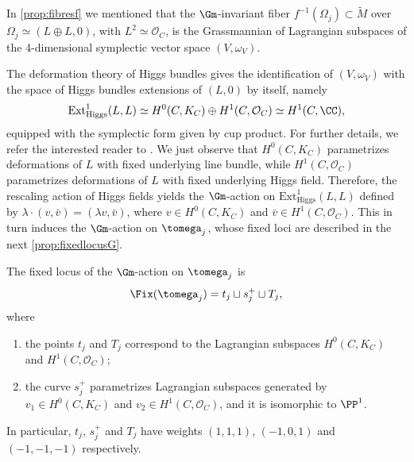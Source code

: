 In \cref{prop:fibresf} we mentioned that the $\Gm$\nobreakdash-invariant fiber $f^{-1}(\Omega_j) \subset \widetilde{M}$ over $\Omega_j \simeq (L \oplus L, 0)$, with $L^2 \simeq \mathcal{O}_C$, is the Grassmannian of Lagrangian subspaces of the 4-dimensional symplectic vector space $(V, \omega_V)$.

The deformation theory of Higgs bundles gives the identification of $(V, \omega_V)$ with the space of Higgs bundles extensions of $(L,0)$ by itself, namely
\[
\mathrm{Ext}^1_{\mathrm{Higgs}}(L,L)\simeq H^0(C, K_C) \oplus H^1(C, \mathcal{O}_C) \simeq H^1(C, \CC),
\]
equipped with the symplectic form given by cup product. For further details, we refer the interested reader to \cite[\S 3.2.2]{Felisetti2018}. We just observe that $H^0(C, K_C)$ parametrizes deformations of $L$ with fixed underlying line bundle, while $H^1(C, \mathcal{O}_C)$ parametrizes deformations of $L$ with fixed underlying Higgs field. Therefore, the rescaling action of Higgs fields yields the $\Gm$\nobreakdash-action on $\mathrm{Ext}^1_{\mathrm{Higgs}}(L,L)$ defined by
$\lambda \cdot (v,\bar{v})=(\lambda v, \bar{v})$, where $v \in H^0(C, K_C)$ and $\bar{v} \in H^1(C, \mathcal{O}_C)$. This in turn induces the $\Gm$\nobreakdash-action on $\tomega_j$, whose fixed loci are described in the next \cref{prop:fixedlocusG}.
\begin{prop} \label{prop:fixedlocusG}
The fixed locus of the $\Gm$\nobreakdash-action on $\tomega_j$ is
\[
\Fix(\tomega_j)= t_j \sqcup s^+_j \sqcup T_j,
\]
where
\begin{enumerate}
\item the points $t_j$ and $T_j$ correspond to the Lagrangian subspaces $H^0(C, K_C)$ and $H^1(C, \mathcal{O}_C)$;
\item the curve $s^+_j$ parametrizes Lagrangian subspaces generated by $v_1 \in H^0(C, K_C)$ and $v_2 \in H^1(C, \mathcal{O}_C)$, and it is isomorphic to $\PP^1$.
\end{enumerate}
In particular, $t_j$, $s^+_j$ and $T_j$ have weights $(1,1,1)$, $(-1,0,1)$ and $(-1,-1,-1)$ respectively.
\end{prop}
